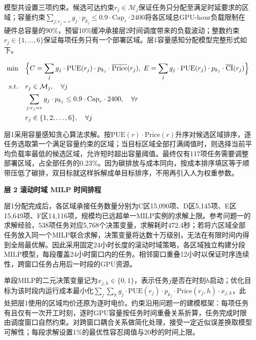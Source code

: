 模型共设置三项约束。候选可达约束$r_j\in\mathcal{M}_j$保证任务只分配至满足时延要求的区域；容量约束$\sum_{j:r_j=r}g_j\cdot p_{k_j}\le0.9\cdot\text{Cap}_r\cdot2400$将各区域总GPU-hour负载限制在硬件总容量的90\%，预留10\%缓冲承接层2时间调度带来的负载波动；整数约束$r_j\in\{1,\dots,6\}$保证每项任务只有一个部署区域。层1容量感知分配模型完整形式如下。

\begin{equation}
\begin{aligned}
\min \quad & \Bigl\{ C = \sum_{j} g_j \cdot \text{PUE}(r_j) \cdot p_{k_j} \cdot \overline{\text{Price}}(r_j), \;
            E = \sum_{j} g_j \cdot \text{PUE}(r_j) \cdot p_{k_j} \cdot \overline{\text{CI}}(r_j) \Bigr\} \\
\text{s.t.} \quad & r_j \in \mathcal{M}_j,\quad \forall j \\
& \sum_{j: r_j = r} g_j \cdot p_{k_j} \le 0.9 \cdot \text{Cap}_r \cdot 2400,\quad \forall r \\
& r_j \in \{1,2,\dots,6\},\quad \forall j
\end{aligned}
\end{equation}

层1采用容量感知贪心算法求解。按$\text{PUE}(r)\cdot\overline{\text{Price}}(r)$升序对候选区域排序，逐任务选取第一个满足容量约束的区域；当目标区域全部打满阈值时，则选择当前平均负载率最低的候选区域，允许短时超出容量阈值。最终仅有117项任务需要调整部署区域，占全部任务的0.23\%。因为碳排放与成本同向，按成本排序填区等于顺带压低了碳排，双目标就这样拆解成单目标排序，不用再引入人为权重参数。

\medskip\noindent\textbf{层 2 \quad 滚动时域 MILP 时间排程}\medskip

层1分配完成后，各区域承接任务数量分别为C区15{,}090项、D区5{,}145项、E区15{,}649项、F区14{,}116项，规模均已远超单一MILP实例的求解上限。参考问题一的求解经验，538项任务对应5{,}768个决策变量，求解耗时472.4秒；若将六区域全部任务放入同一个MILP联合求解，决策变量将达数十万级别，无法在有限时间内得到全局最优解。因此采用固定24小时长度的滚动时域策略，各区域独立构建分段MILP模型，每段覆盖24小时窗口内的任务。相邻窗口重叠12小时以保证时序连续性，跨窗口任务占用后一时段的GPU资源。

单段MILP的二元决策变量记为$x_{j,h}\in\{0,1\}$，表示任务$j$是否在时刻$h$启动；优化目标为该时段内运行成本最小化$\sum_j\sum_h g_j\cdot\text{PUE}(r_j)\cdot p_{k_j}\cdot\text{Price}(r_j,h)\cdot x_{j,h}$，此处把层1使用的区域均价还原为逐时电价。约束沿用问题一的建模框架：每项任务有且仅有一次开工时刻，逐时GPU容量按任务时间重叠关系折算，任务完成时限由调度窗口自然约束。对跨窗口耦合关系做简化处理，接受一定近似误差换取模型可解性；每段求解设置1\%的最优性容忍阈值与20秒的时间上限。


